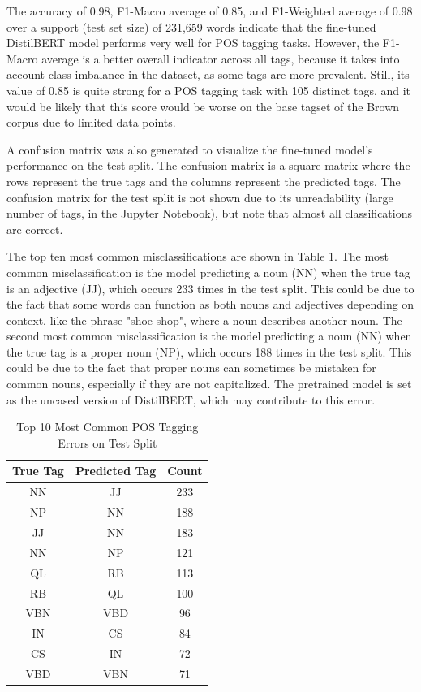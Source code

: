 \documentclass[10pt,twocolumn,letterpaper]{article}
\begin{document}
The accuracy of 0.98, F1-Macro average of 0.85, and F1-Weighted average of 0.98 over a support (test set size) of 231,659 words indicate that the fine-tuned DistilBERT model performs very well for POS tagging tasks. However, the F1-Macro average is a better overall indicator across all tags, because it takes into account class imbalance in the dataset, as some tags are more prevalent. Still, its value of 0.85 is quite strong for a POS tagging task with 105 distinct tags, and it would be likely that this score would be worse on the base tagset of the Brown corpus due to limited data points.

A confusion matrix was also generated to visualize the fine-tuned model's performance on the test split. The confusion matrix is a square matrix where the rows represent the true tags and the columns represent the predicted tags. The confusion matrix for the test split is not shown due to its unreadability (large number of tags, in the Jupyter Notebook), but note that almost all classifications are correct.

The top ten most common misclassifications are shown in Table \ref{tab:top_errors}. The most common misclassification is the model predicting a noun (NN) when the true tag is an adjective (JJ), which occurs 233 times in the test split. This could be due to the fact that some words can function as both nouns and adjectives depending on context, like the phrase "shoe shop", where a noun describes another noun. The second most common misclassification is the model predicting a noun (NN) when the true tag is a proper noun (NP), which occurs 188 times in the test split. This could be due to the fact that proper nouns can sometimes be mistaken for common nouns, especially if they are not capitalized. The pretrained model is set as the uncased version of DistilBERT, which may contribute to this error.

\begin{table}[!ht]
\centering
\caption{Top 10 Most Common POS Tagging Errors on Test Split}
\label{tab:top_errors}
\begin{tabular}{|c|c|c|}
\hline
\textbf{True Tag} & \textbf{Predicted Tag} & \textbf{Count} \\
\hline
NN & JJ & 233 \\
NP & NN & 188 \\
JJ & NN & 183 \\
NN & NP & 121 \\
QL & RB & 113 \\
RB & QL & 100 \\
VBN & VBD & 96 \\
IN & CS & 84 \\
CS & IN & 72 \\
VBD & VBN & 71 \\
\hline
\end{tabular}
\end{table}
\end{document}
